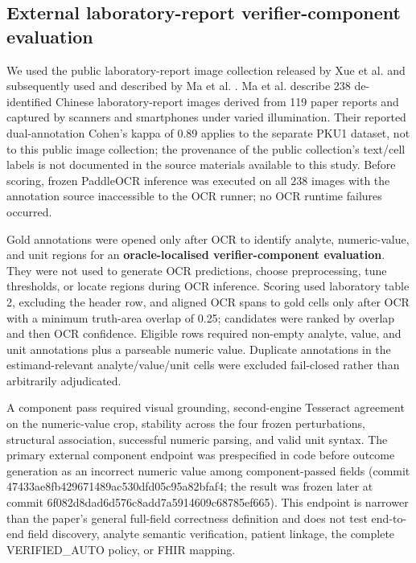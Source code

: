\documentclass[10pt]{article}
\begin{document}
\subsection{External laboratory-report verifier-component evaluation}

We used the public laboratory-report image collection released by Xue et al. and subsequently used and described by Ma et al. \cite{xue2020labocr,ma2023labocr}. Ma et al. describe 238 de-identified Chinese laboratory-report images derived from 119 paper reports and captured by scanners and smartphones under varied illumination. Their reported dual-annotation Cohen's kappa of 0.89 applies to the separate PKU1 dataset, not to this public image collection; the provenance of the public collection's text/cell labels is not documented in the source materials available to this study. Before scoring, frozen PaddleOCR inference was executed on all 238 images with the annotation source inaccessible to the OCR runner; no OCR runtime failures occurred.

Gold annotations were opened only after OCR to identify analyte, numeric-value, and unit regions for an \textbf{oracle-localised verifier-component evaluation}. They were not used to generate OCR predictions, choose preprocessing, tune thresholds, or locate regions during OCR inference. Scoring used laboratory table 2, excluding the header row, and aligned OCR spans to gold cells only after OCR with a minimum truth-area overlap of 0.25; candidates were ranked by overlap and then OCR confidence. Eligible rows required non-empty analyte, value, and unit annotations plus a parseable numeric value. Duplicate annotations in the estimand-relevant analyte/value/unit cells were excluded fail-closed rather than arbitrarily adjudicated.

A component pass required visual grounding, second-engine Tesseract agreement on the numeric-value crop, stability across the four frozen perturbations, structural association, successful numeric parsing, and valid unit syntax. The primary external component endpoint was prespecified in code before outcome generation as an incorrect numeric value among component-passed fields (commit 47433ae8fb429671489ac530dfd05c95a82bfaf4; the result was frozen later at commit 6f082d8dad6d576c8add7a5914609c68785ef665). This endpoint is narrower than the paper's general full-field correctness definition and does not test end-to-end field discovery, analyte semantic verification, patient linkage, the complete VERIFIED\_AUTO policy, or FHIR mapping.
\end{document}
